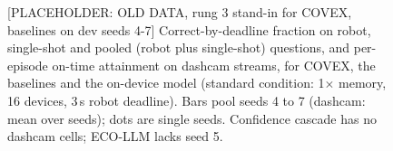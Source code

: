 \documentclass[sigconf]{acmart}
\begin{document}
{\selectfont
\begin{figure}[t]
  \centering
  
  \caption{{[}PLACEHOLDER: OLD DATA, rung 3 stand-in for COVEX, baselines on dev seeds 4-7] Correct-by-deadline fraction on robot, single-shot and pooled (robot plus single-shot) questions, and per-episode on-time attainment on dashcam streams, for COVEX, the baselines and the on-device model (standard condition: 1$\times$ memory, 16 devices, 3\,s robot deadline). Bars pool seeds 4 to 7 (dashcam: mean over seeds); dots are single seeds. Confidence cascade has no dashcam cells; ECO-LLM lacks seed 5.}
  \label{fig:F1_headline}
\end{figure}
}


\end{document}
